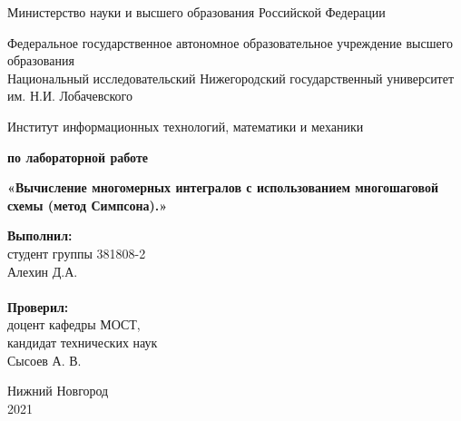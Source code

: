 \documentclass{report}
\begin{document}
\begin{titlepage}

\begin{center}
Министерство науки и высшего образования Российской Федерации
\end{center}

\begin{center}
Федеральное государственное автономное образовательное учреждение высшего образования \\
Национальный исследовательский Нижегородский государственный университет им. Н.И. Лобачевского
\end{center}

\begin{center}
Институт информационных технологий, математики и механики
\end{center}

\vspace{4em}

\begin{center}
\textbf{ по лабораторной работе} \\
\end{center}
\begin{center}
\textbf{\Large«Вычисление многомерных интегралов с использованием многошаговой схемы (метод Симпсона).»} \\
\end{center}

\vspace{4em}

\newbox{\lbox}
\newlength{\maxl}
\setlength{\maxl}{\wd\lbox}
\hfill\parbox{7cm}{
\hspace*{5cm}\hspace*{-5cm}\textbf{Выполнил:} \\ студент группы 381808-2 \\ Алехин Д.А. \\
\\
\hspace*{5cm}\hspace*{-5cm}\textbf{Проверил:}\\ доцент кафедры МОСТ, \\ кандидат технических наук \\ Сысоев А. В. \\
}
\vspace{\fill}

\begin{center} Нижний Новгород \\ 2021 \end{center}

\end{titlepage}
\end{document}
